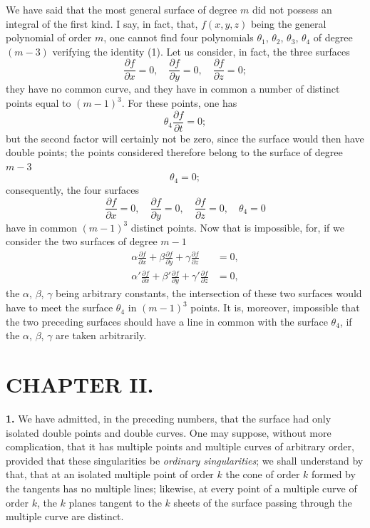 \documentclass{article}
\begin{document}
We have said that the most general surface of degree $m$ did not possess an integral of the first kind. I say, in fact, that, $f(x, y, z)$ being the general polynomial of order $m$, one cannot find four polynomials $\theta_{1}$, $\theta_{2}$, $\theta_{3}$, $\theta_{4}$ of degree $(m - 3)$ verifying the identity (1). Let us consider, in fact, the three surfaces
\[
\frac{\partial f}{\partial x} = 0, \quad \frac{\partial f}{\partial y} = 0, \quad \frac{\partial f}{\partial z} = 0;
\]
they have no common curve, and they have in common a number of distinct points equal to $(m - 1)^{3}$. For these points, one has
\[
\theta_{4} \frac{\partial f}{\partial t} = 0;
\]
but the second factor will certainly not be zero, since the surface would then have double points; the points considered therefore belong to the surface of degree $m - 3$
\[
\theta_{4} = 0;
\]
consequently, the four surfaces
\[
\frac{\partial f}{\partial x} = 0, \quad \frac{\partial f}{\partial y} = 0, \quad \frac{\partial f}{\partial z} = 0, \quad \theta_{4} = 0
\]
have in common $(m - 1)^{3}$ distinct points. Now that is impossible, for, if we consider the two surfaces of degree $m - 1$
\[
\begin{aligned}
\alpha \frac{\partial f}{\partial x} + \beta \frac{\partial f}{\partial y} + \gamma \frac{\partial f}{\partial z} &= 0, \\
\alpha' \frac{\partial f}{\partial x} + \beta' \frac{\partial f}{\partial y} + \gamma' \frac{\partial f}{\partial z} &= 0,
\end{aligned}
\]
the $\alpha$, $\beta$, $\gamma$ being arbitrary constants, the intersection of these two surfaces would have to meet the surface $\theta_{4}$ in $(m - 1)^{3}$ points. It is, moreover, impossible that the two preceding surfaces should have a line in common with the surface $\theta_{4}$, if the $\alpha$, $\beta$, $\gamma$ are taken arbitrarily.

\section*{CHAPTER II.}

\textbf{1.} We have admitted, in the preceding numbers, that the surface had only isolated double points and double curves. One may suppose, without more complication, that it has multiple points and multiple curves of arbitrary order, provided that these singularities be \emph{ordinary singularities}; we shall understand by that, that at an isolated multiple point of order $k$ the cone of order $k$ formed by the tangents has no multiple lines; likewise, at every point of a multiple curve of order $k$, the $k$ planes tangent to the $k$ sheets of the surface passing through the multiple curve are distinct.
\end{document}
